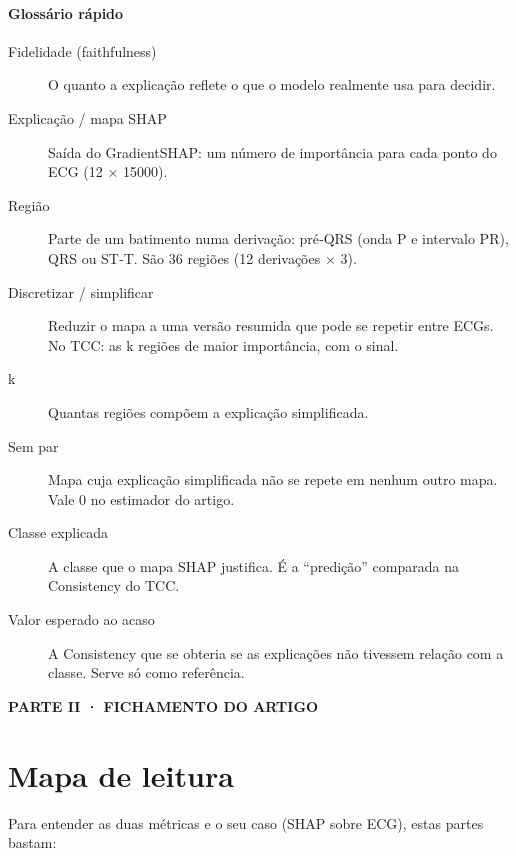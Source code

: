 \documentclass[11pt,a4paper]{article}
\newcommand{\partbar}[1]{\par\vspace{1.2em}\noindent\colorbox{black!80}{\parbox{\dimexpr\linewidth-2\fboxsep}{\color{white}\bfseries\sffamily\MakeUppercase{#1}}}\par\vspace{0.4em}}
\begin{document}
\paragraph{Glossário rápido}
\begin{description}
\item[Fidelidade (faithfulness)] O quanto a explicação reflete o que o modelo realmente usa para decidir.
\item[Explicação / mapa SHAP] Saída do GradientSHAP: um número de importância para cada ponto do ECG (12 × 15000).
\item[Região] Parte de um batimento numa derivação: pré‑QRS (onda P e intervalo PR), QRS ou ST‑T. São 36 regiões (12 derivações × 3).
\item[Discretizar / simplificar] Reduzir o mapa a uma versão resumida que pode se repetir entre ECGs. No TCC: as k regiões de maior importância, com o sinal.
\item[k] Quantas regiões compõem a explicação simplificada.
\item[Sem par] Mapa cuja explicação simplificada não se repete em nenhum outro mapa. Vale 0 no estimador do artigo.
\item[Classe explicada] A classe que o mapa SHAP justifica. É a “predição” comparada na Consistency do TCC.
\item[Valor esperado ao acaso] A Consistency que se obteria se as explicações não tivessem relação com a classe. Serve só como referência.
\end{description}

\partbar{Parte II · Fichamento do artigo}

\section{Mapa de leitura}
Para entender as duas métricas e o seu caso (SHAP sobre ECG), estas partes bastam:
\end{document}
